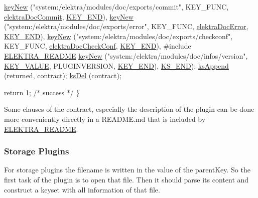 \begin{DoxyCodeInclude}
                               \hyperlink{group__key_gad23c65b44bf48d773759e1f9a4d43b89}{keyNew} (\textcolor{stringliteral}{"system:/elektra/modules/doc/exports/commit"}, KEY\_FUNC, 
      \hyperlink{group__plugin_ga52807469897b8acbada5bcc6b8c8ceab}{elektraDocCommit}, \hyperlink{group__key_gga9b703ca49f48b482def322b77d3e6bc8aa8adb6fcb92dec58fb19410eacfdd403}{KEY\_END}),
                               \hyperlink{group__key_gad23c65b44bf48d773759e1f9a4d43b89}{keyNew} (\textcolor{stringliteral}{"system:/elektra/modules/doc/exports/error"}, KEY\_FUNC, 
      \hyperlink{group__plugin_gad74b35f558ac7c3262f6069c5c47dc79}{elektraDocError}, \hyperlink{group__key_gga9b703ca49f48b482def322b77d3e6bc8aa8adb6fcb92dec58fb19410eacfdd403}{KEY\_END}),
                               \hyperlink{group__key_gad23c65b44bf48d773759e1f9a4d43b89}{keyNew} (\textcolor{stringliteral}{"system:/elektra/modules/doc/exports/checkconf"}, KEY\_FUNC, 
      \hyperlink{group__plugin_ga1c8702efe0f3853c2d7ecca0889f78e8}{elektraDocCheckConf}, \hyperlink{group__key_gga9b703ca49f48b482def322b77d3e6bc8aa8adb6fcb92dec58fb19410eacfdd403}{KEY\_END}),
#include \hyperlink{group__plugin_gabdcb97b05a83130c32bbde75db80fc50}{ELEKTRA\_README}
                               \hyperlink{group__key_gad23c65b44bf48d773759e1f9a4d43b89}{keyNew} (\textcolor{stringliteral}{"system:/elektra/modules/doc/infos/version"}, 
      \hyperlink{group__key_gga9b703ca49f48b482def322b77d3e6bc8ac66e4a49d09212b79f5754ca6db5bd2e}{KEY\_VALUE}, PLUGINVERSION, \hyperlink{group__key_gga9b703ca49f48b482def322b77d3e6bc8aa8adb6fcb92dec58fb19410eacfdd403}{KEY\_END}), \hyperlink{group__keyset_ga7a28fce3773b2c873c94ac80b8b4cd54}{KS\_END});
                \hyperlink{group__keyset_ga21eb9c3a14a604ee3a8bdc779232e7b7}{ksAppend} (returned, contract);
                \hyperlink{group__keyset_ga27e5c16473b02a422238c8d970db7ac8}{ksDel} (contract);

                \textcolor{keywordflow}{return} 1; \textcolor{comment}{/* success */}
        \}
\end{DoxyCodeInclude}
 Some clauses of the contract, especially the description of the plugin can be done more conveniently directly in a R\+E\+A\+D\+M\+E.\+md that is included by \hyperlink{group__plugin_gabdcb97b05a83130c32bbde75db80fc50}{E\+L\+E\+K\+T\+R\+A\+\_\+\+R\+E\+A\+D\+ME}.\hypertarget{group__plugin_storage}{}\subsubsection{Storage Plugins}\label{group__plugin_storage}
For storage plugins the filename is written in the value of the parent\+Key. So the first task of the plugin is to open that file. Then it should parse its content and construct a keyset with all information of that file.

